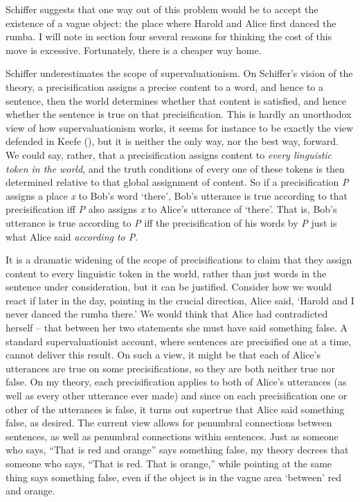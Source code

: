 \documentclass[
  11pt,
  letterpaper,
  DIV=11,
  numbers=noendperiod,
  oneside]{scrartcl}
\begin{document}
Schiffer suggests that one way out of this problem would be to accept
the existence of a vague object: the place where Harold and Alice first
danced the rumba. I will note in section four several reasons for
thinking the cost of this move is excessive. Fortunately, there is a
cheaper way home.

Schiffer underestimates the scope of supervaluationism. On Schiffer's
vision of the theory, a precisification assigns a precise content to a
word, and hence to a sentence, then the world determines whether that
content is satisfied, and hence whether the sentence is true on that
precisification. This is hardly an unorthodox view of how
supervaluationism works, it seems for instance to be exactly the view
defended in Keefe (), but it is neither
the only way, nor the best way, forward. We could say, rather, that a
precisification assigns content to \emph{every linguistic token in the
world}, and the truth conditions of every one of these tokens is then
determined relative to that global assignment of content. So if a
precisification \emph{P} assigns a place \emph{x} to Bob's word `there',
Bob's utterance is true according to that precisification iff \emph{P}
also assigns \emph{x} to Alice's utterance of `there'. That is, Bob's
utterance is true according to \emph{P} iff the precisification of his
words by \emph{P} just is what Alice said \emph{according to
P}.

It is a dramatic widening of the scope of precisifications to claim that
they assign content to every linguistic token in the world, rather than
just words in the sentence under consideration, but it can be
justified.
Consider how we would react if later in the day, pointing in the crucial
direction, Alice said, `Harold and I never danced the rumba there.' We
would think that Alice had contradicted herself -- that between her two
statements she must have said something false. A standard
supervaluationist account, where sentences are precisified one at a
time, cannot deliver this result. On such a view, it might be that each
of Alice's utterances are true on some precisifications, so they are
both neither true nor false. On my theory, each precisification applies
to both of Alice's utterances (as well as every other utterance ever
made) and since on each precisification one or other of the utterances
is false, it turns out supertrue that Alice said something false, as
desired. The current view allows for penumbral connections between
sentences, as well as penumbral connections within sentences. Just as
someone who says, ``That is red and orange'' says something false, my
theory decrees that someone who says, ``That is red. That is orange,''
while pointing at the same thing says something false, even if the
object is in the vague area `between' red and orange.
\end{document}
